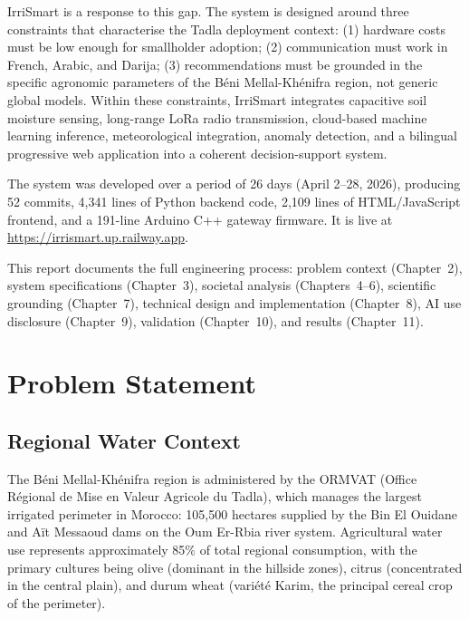 \documentclass[12pt,a4paper]{report}
\begin{document}
IrriSmart is a response to this gap. The system is designed around three constraints that characterise the Tadla deployment context: (1) hardware costs must be low enough for smallholder adoption; (2) communication must work in French, Arabic, and Darija; (3) recommendations must be grounded in the specific agronomic parameters of the Béni Mellal-Khénifra region, not generic global models. Within these constraints, IrriSmart integrates capacitive soil moisture sensing, long-range LoRa radio transmission, cloud-based machine learning inference, meteorological integration, anomaly detection, and a bilingual progressive web application into a coherent decision-support system.

The system was developed over a period of 26 days (April 2--28, 2026), producing 52 commits, 4,341 lines of Python backend code, 2,109 lines of HTML/JavaScript frontend, and a 191-line Arduino C++ gateway firmware. It is live at \url{https://irrismart.up.railway.app}.

This report documents the full engineering process: problem context (Chapter~2), system specifications (Chapter~3), societal analysis (Chapters~4--6), scientific grounding (Chapter~7), technical design and implementation (Chapter~8), AI use disclosure (Chapter~9), validation (Chapter~10), and results (Chapter~11).

\chapter{Problem Statement}

\section{Regional Water Context}

The Béni Mellal-Khénifra region is administered by the ORMVAT (Office Régional de Mise en Valeur Agricole du Tadla), which manages the largest irrigated perimeter in Morocco: 105,500 hectares supplied by the Bin El Ouidane and Aït Messaoud dams on the Oum Er-Rbia river system. Agricultural water use represents approximately 85\% of total regional consumption, with the primary cultures being olive (dominant in the hillside zones), citrus (concentrated in the central plain), and durum wheat (variété Karim, the principal cereal crop of the perimeter).
\end{document}
